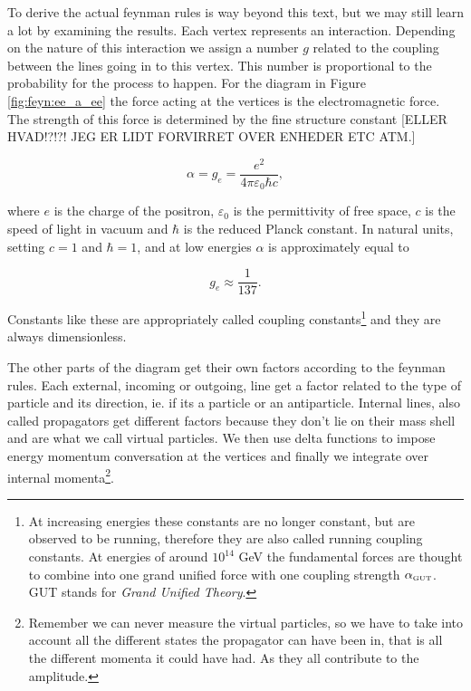 To derive the actual feynman rules is way beyond this text, but we may still learn a lot by examining the results. Each vertex represents an interaction. Depending on the nature of this interaction we assign a number $g$ related to the coupling between the lines going in to this vertex. This number is proportional to the probability for the process to happen. For the diagram in Figure \ref{fig:feyn:ee_a_ee} the force acting at the vertices is the electromagnetic force. The strength of this force is determined by the fine structure constant [ELLER HVAD!?!?! JEG ER LIDT FORVIRRET OVER ENHEDER ETC ATM.]

\begin{equation}
	\alpha = g_e = \frac{e^2}{4\pi\varepsilon_0\hbar c},
\end{equation}

where $e$ is the charge of the positron, $\varepsilon_0$ is the permittivity of free space, $c$ is the speed of light in vacuum and $\hbar$ is the reduced Planck constant. In natural units, setting $c = 1$ and $\hbar = 1$, and at low energies $\alpha$ is approximately equal to

\begin{equation}
	 g_e \approx \frac{1}{137}.
\end{equation}

Constants like these are appropriately called coupling constants\footnote{At increasing energies these constants are no longer constant, but are observed to be running, therefore they are also called running coupling constants. At energies of around $10^{14}$ GeV the fundamental forces are thought to combine into one grand unified force with one coupling strength $\alpha_{\textrm{\tiny{GUT}}}$. GUT stands for \emph{Grand Unified Theory}.} and they are always dimensionless.

The other parts of the diagram get their own factors according to the feynman rules. Each external, incoming or outgoing, line get a factor related to the type of particle and its direction, ie. if its a particle or an antiparticle. Internal lines, also called propagators get different factors because they don't lie on their mass shell and are what we call virtual particles. We then use delta functions to impose energy momentum conversation at the vertices and finally we integrate over internal momenta\footnote{Remember we can never measure the virtual particles, so we have to take into account all the different states the propagator can have been in, that is all the different momenta it could have had. As they all contribute to the amplitude.}.


